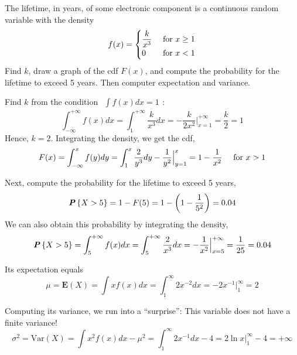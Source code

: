 \begin{example_break}{}
  The lifetime, in years, of some electronic component is a continuous random variable with the density
  \begin{equation*}
    f(x) = \begin{cases}
      \dfrac{k}{x^3} &\textnormal{ for } x \geq 1\\
      0 &\textnormal{ for } x < 1\\
    \end{cases}
  \end{equation*}
  Find $k$, draw a graph of the cdf $F(x)$, and compute the probability for the lifetime to exceed 5 years. Then computer expectation and variance.

  Find $k$ from the condition $\begin{aligned}\int f(x)dx = 1\end{aligned}$:
  \begin{equation*}
    \int_{-\infty}^{+\infty} f(x)dx = \int_1^{+\infty} \frac{k}{x^3} dx = - \frac{k}{2x^2} \Big|_{x = 1}^{+\infty} = \frac{k}{2} = 1
  \end{equation*}
  Hence, $k = 2$. Integrating the density, we get the cdf,
  \begin{equation*}
    F(x) = \int_{-\infty}^x f(y)dy = \int_1^x \frac{2}{y^3} dy -\frac{1}{y^2} \Big|_{y=1}^x = 1 - \frac{1}{x^2}\ \ \ \ \textnormal{for $x > 1$}
  \end{equation*}
  
  Next, compute the probability for the lifetime to exceed 5 years,
  \begin{equation*}
    \textbf{\textit{P}}\left\{X > 5\right\} = 1 - F(5) = 1 - \left(1 - \frac{1}{5^2}\right) = 0.04
  \end{equation*}
  We can also obtain this probability by integrating the density,
  \begin{equation*}
    \textbf{\textit{P}}\left\{X > 5\right\} = \int_5^{+\infty} f(x)dx = \int_5^{+\infty} \frac{2}{x^3}dx = -\frac{1}{x^2} \Big|_{x = 5}^{+\infty} = \frac{1}{25} = 0.04
  \end{equation*}
  
  Its expectation equals
  \begin{equation*}
    \mu = \mathbf{E}(X) = \int x f(x)dx = \int_1^{\infty} 2x^{-2}dx = -2x^{-1} \Big|_1^{\infty} = 2
  \end{equation*}

  Computing its variance, we run into a ``surprise'': This variable does not have a finite variance!
  \begin{equation*}
    \sigma^2 = \text{Var}(X) = \int x^2 f(x)dx - \mu^2 = \int_1^{\infty} 2x^{-1}dx - 4 = 2 \ln x \Big|_1^{\infty} - 4 = +\infty
  \end{equation*}
\end{example_break}
